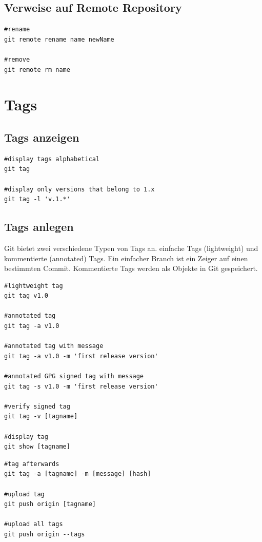 \subsection{Verweise auf Remote Repository}
\begin{lstlisting}[caption={Verweise auf Remote Repo},captionpos=b]
#rename
git remote rename name newName

#remove
git remote rm name
\end{lstlisting}
\section{Tags}
\subsection{Tags anzeigen}
\begin{lstlisting}[caption={Tags anzeigen},captionpos=b]
#display tags alphabetical
git tag

#display only versions that belong to 1.x
git tag -l 'v.1.*'
\end{lstlisting}
\subsection{Tags anlegen}
Git bietet zwei verschiedene Typen von Tags an. einfache Tags (lightweight) und kommentierte (annotated) Tags. Ein einfacher Branch ist ein Zeiger auf einen bestimmten Commit. Kommentierte Tags werden als Objekte in Git gespeichert.\\
\begin{lstlisting}[caption={Tags anlegen (Teil 1)},captionpos=b]
#lightweight tag
git tag v1.0

#annotated tag
git tag -a v1.0

#annotated tag with message
git tag -a v1.0 -m 'first release version'

#annotated GPG signed tag with message
git tag -s v1.0 -m 'first release version'

#verify signed tag
git tag -v [tagname]

#display tag
git show [tagname]
\end{lstlisting}
\newpage
\begin{lstlisting}[caption={Tags anlegen (Teil 2)},captionpos=b]
#tag afterwards
git tag -a [tagname] -m [message] [hash]

#upload tag
git push origin [tagname]

#upload all tags
git push origin --tags
\end{lstlisting}
